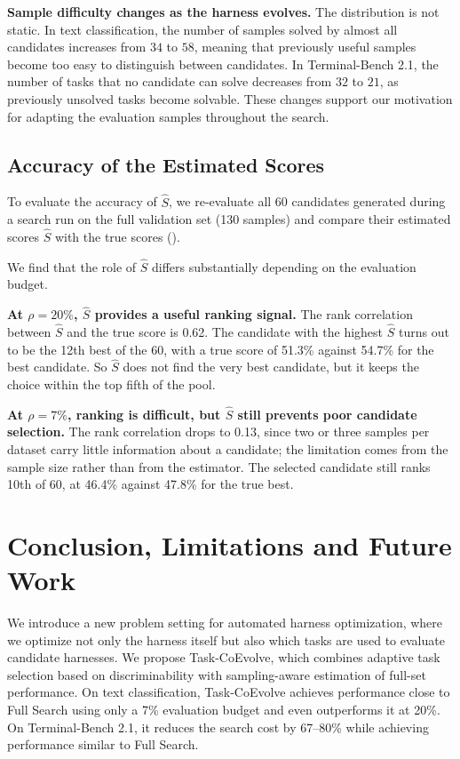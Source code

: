 \documentclass{article} %
\begin{document}
\textbf{Sample difficulty changes as the harness evolves.}
The distribution is not static. In text classification, the number of samples solved by almost all candidates increases from $34$ to $58$, meaning that previously useful samples become too easy to distinguish between candidates. In Terminal-Bench 2.1, the number of tasks that no candidate can solve decreases from $32$ to $21$, as previously unsolved tasks become solvable. These changes support our motivation for adapting the evaluation samples throughout the search.

\subsection{Accuracy of the Estimated Scores}
To evaluate the accuracy of $\hat{S}$, we re-evaluate all 60 candidates generated during a search run on the full validation set (130 samples) and compare their estimated scores $\hat{S}$ with the true scores ().


We find that the role of $\hat{S}$ differs substantially depending on the evaluation budget.


\textbf{At $\rho=20\%$, $\hat{S}$ provides a useful ranking signal.}
The rank correlation between $\hat{S}$ and the true score is 0.62. The candidate with the highest $\hat{S}$ turns out to be the 12th best of the 60, with a true score of 51.3\% against 54.7\% for the best candidate. So $\hat{S}$ does not find the very best candidate, but it keeps the choice within the top fifth of the pool.


\textbf{At $\rho=7\%$, ranking is difficult, but $\hat{S}$ still prevents poor candidate selection.}
The rank correlation drops to 0.13, since two or three samples per dataset carry little information about a candidate; the limitation comes from the sample size rather than from the estimator. The selected candidate still ranks 10th of 60, at 46.4\% against 47.8\% for the true best.


\section{Conclusion, Limitations and Future Work}

We introduce a new problem setting for automated harness optimization, where we optimize not only the harness itself but also which tasks are used to evaluate candidate harnesses. We propose Task-CoEvolve, which combines adaptive task selection based on discriminability with sampling-aware estimation of full-set performance. On text classification, Task-CoEvolve achieves performance close to Full Search using only a 7\% evaluation budget and even outperforms it at 20\%. On Terminal-Bench 2.1, it reduces the search cost by 67--80\% while achieving performance similar to Full Search.
\end{document}
